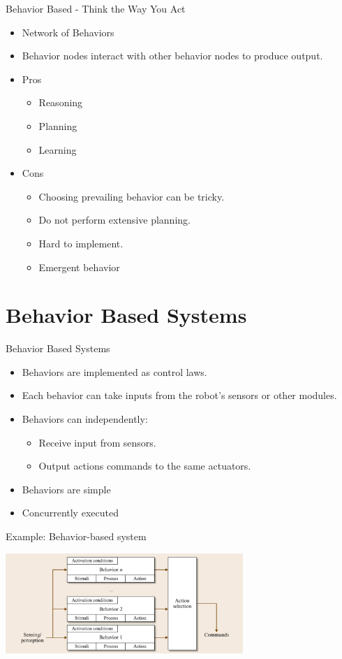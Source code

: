 \documentclass{beamer}
\begin{document}
\begin{frame}{Behavior Based - Think the Way You Act}
 \begin{itemize}
   \item Network of Behaviors
   \item Behavior nodes interact with other behavior nodes to produce output.
   \item Pros
   \begin{itemize}
     \item Reasoning
     \item Planning
     \item Learning
   \end{itemize}
   \item Cons
   \begin{itemize}
     \item Choosing prevailing behavior can be tricky.
     \item Do not perform extensive planning.
     \item Hard to implement.
     \item Emergent behavior
   \end{itemize}
 \end{itemize}
\end{frame}

\section{Behavior Based Systems}
\begin{frame}{Behavior Based Systems}
 \begin{itemize}
  \item Behaviors are implemented as control laws.
  \item Each behavior can take inputs from the robot's sensors or other modules.
  \item Behaviors can independently:
  \begin{itemize}
    \item Receive input from sensors.
    \item Output actions commands to the same actuators.
  \end{itemize}
  \item Behaviors are simple
  \item Concurrently executed
 \end{itemize}
\end{frame}

\begin{frame}{Example: Behavior-based system}
 \begin{center}
  \includegraphics[width=9cm]{behavior_system.png}
 \end{center}
\end{frame}
\end{document}
